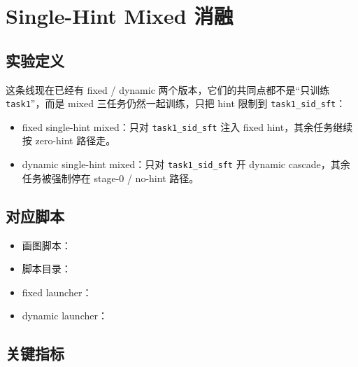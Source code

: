 \section{Single-Hint Mixed 消融}

\subsection{实验定义}

这条线现在已经有 fixed / dynamic 两个版本，它们的共同点都不是“只训练 \texttt{task1}”，而是 mixed 三任务仍然一起训练，只把 hint 限制到 \texttt{task1\_sid\_sft}：

\begin{itemize}
\item fixed single-hint mixed：只对 \texttt{task1\_sid\_sft} 注入 fixed hint，其余任务继续按 zero-hint 路径走。
\item dynamic single-hint mixed：只对 \texttt{task1\_sid\_sft} 开 dynamic cascade，其余任务被强制停在 stage-0 / no-hint 路径。
\end{itemize}

\subsection{对应脚本}

{\footnotesize
\begin{itemize}
\item 画图脚本：
\item 脚本目录：
\item fixed launcher：
\item dynamic launcher：
\end{itemize}
}

\subsection{关键指标}

